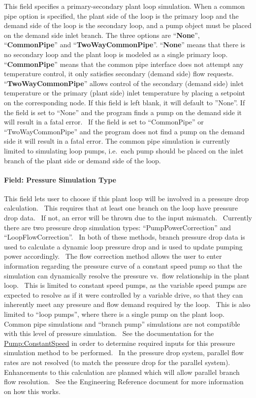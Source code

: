 This field specifies a primary-secondary plant loop simulation. When a common pipe option is specified, the plant side of the loop is the primary loop and the demand side of the loop is the secondary loop, and a pump object must be placed on the demand side inlet branch. The three options are ``\textbf{None}'', ``\textbf{CommonPipe}'' and ``\textbf{TwoWayCommonPipe}''. ``\textbf{None}'' means that there is no secondary loop and the plant loop is modeled as a single primary loop. ``\textbf{CommonPipe}'' means that the common pipe interface does not attempt any temperature control, it only satisfies secondary (demand side) flow requests. ``\textbf{TwoWayCommonPipe}'' allows control of the secondary (demand side) inlet temperature or the primary (plant side) inlet temperature by placing a setpoint on the corresponding node. If this field is left blank, it will default to ''None''. If the field is set to ``None'' and the program finds a pump on the demand side it will result in a fatal error.~ If the field is set to ``CommonPipe'' or ``TwoWayCommonPipe'' and the program does not find a pump on the demand side it will result in a fatal error. The common pipe simulation is currently limited to simulating loop pumps, i.e.~each pump should be placed on the inlet branch of the plant side or demand side of the loop.

\paragraph{Field: Pressure Simulation Type}\label{field-pressure-simulation-type}

This field lets user to choose if this plant loop will be involved in a pressure drop calculation.~ This requires that at least one branch on the loop have pressure drop data.~ If not, an error will be thrown due to the input mismatch.~ Currently there are two pressure drop simulation types: ``PumpPowerCorrection'' and ``LoopFlowCorrection''.~ In both of these methods, branch pressure drop data is used to calculate a dynamic loop pressure drop and is used to update pumping power accordingly.~ The flow correction method allows the user to enter information regarding the pressure curve of a constant speed pump so that the simulation can dynamically resolve the pressure vs.~flow relationship in the plant loop.~ This is limited to constant speed pumps, as the variable speed pumps are expected to resolve as if it were controlled by a variable drive, so that they can inherently meet any pressure and flow demand required by the loop.~ This is also limited to ``loop pumps'', where there is a single pump on the plant loop. Common pipe simulations and ``branch pump'' simulations are not compatible with this level of pressure simulation.~ See the documentation for the \hyperref[pumpconstantspeed]{Pump:ConstantSpeed} in order to determine required inputs for this pressure simulation method to be performed.~ In the pressure drop system, parallel flow rates are not resolved (to match the pressure drop for the parallel system).~ Enhancements to this calculation are planned which will allow parallel branch flow resolution.~ See the Engineering Reference document for more information on how this works.

